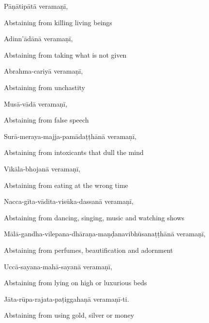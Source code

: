 Pāṇātipātā veramaṇī,

\begin{english}
  Abstaining from killing living beings
\end{english}

Adinn'ādānā veramaṇī,

\begin{english}
  Abstaining from taking what is not given
\end{english}

Abrahma-cariyā veramaṇī,

\begin{english}
  Abstaining from unchastity
\end{english}

Musā-vādā veramaṇī,

\begin{english}
  Abstaining from false speech
\end{english}

Surā-meraya-majja-pamādaṭṭhānā veramaṇī,

\begin{english}
  Abstaining from intoxicants that dull the mind
\end{english}

Vikāla-bhojanā veramaṇī,

\begin{english}
  Abstaining from eating at the wrong time
\end{english}

Nacca-gīta-vādita-visūka-dassanā veramaṇī,

\begin{english}
  Abstaining from dancing, singing, music and watching shows
\end{english}

Mālā-gandha-vilepana-dhāraṇa-maṇḍanavibhūsanaṭṭhānā veramaṇī,

\begin{english}
  Abstaining from perfumes, beautification and adornment
\end{english}

Uccā-sayana-mahā-sayanā veramaṇī,

\begin{english}
  Abstaining from lying on high or luxurious beds
\end{english}

Jāta-rūpa-rajata-paṭiggahaṇā veramaṇī-ti.

\begin{english}
  Abstaining from using gold, silver or money
\end{english}

